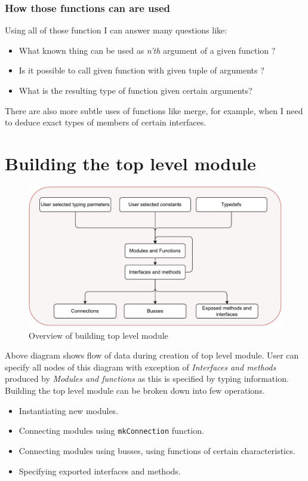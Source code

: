 \documentclass[12pt]{report}
\begin{document}
\subsubsection{How those functions can are used}
Using all of those function I can answer many questions like:
\begin{itemize}
    \item What known thing can be used as \emph{n'th} argument of a given function ?
    \item Is it possible to call given function with given tuple of arguments ?
    \item What is the resulting type of function given certain arguments?
\end{itemize}
There are also more subtle uses of functions like merge, for example, when I need to deduce exact types of members of certain interfaces.
\newpage
\section{Building the top level module}
\begin{figure}[!h]
    \centering
    \caption{Overview of building top level module}

    \includegraphics[width=1.0\columnwidth]{pdfExports/LargeMapBuilding.pdf}
\end{figure}
Above diagram shows flow of data during creation of top level module. User can specify all nodes of this diagram with exception of \emph{Interfaces and methods} produced by \emph{Modules and functions} as this is specified by typing information.
Building the top level module can be broken down into few operations.
\begin{itemize}
    \item Instantiating new modules.
    \item Connecting modules using \verb!mkConnection! function.
    \item Connecting modules using busses, using functions of certain characteristics.
    \item Specifying exported interfaces and methods.
\end{itemize} 
\end{document}
